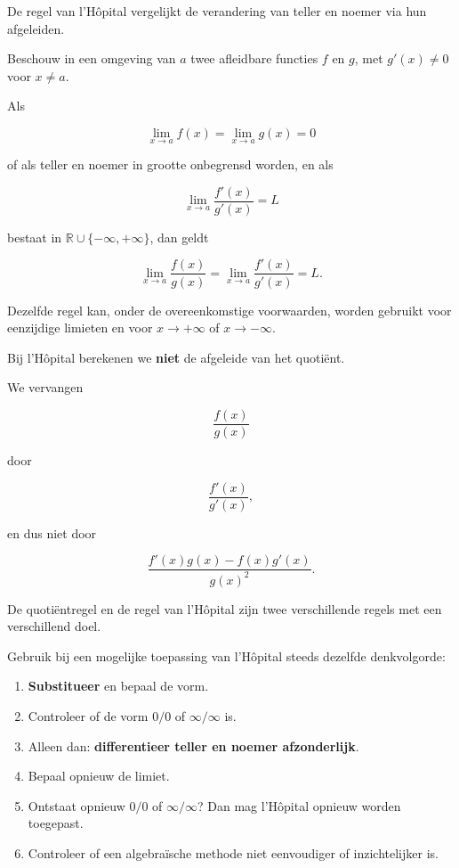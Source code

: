 \documentclass{ximera}
\begin{document}


De regel van l'Hôpital vergelijkt de verandering van teller en noemer
via hun afgeleiden.

\begin{eigenschap}
Beschouw in een omgeving van \(a\) twee afleidbare functies \(f\) en
\(g\), met \(g'(x)\neq0\) voor \(x\neq a\).

Als

\[\lim_{x\to a}f(x)=\lim_{x\to a}g(x)=0\]

of als teller en noemer in grootte onbegrensd worden, en als

\[\lim_{x\to a}\frac{f'(x)}{g'(x)}=L\]

bestaat in \(\mathbb{R}\cup\{-\infty,+\infty\}\), dan geldt

\[\boxed{\lim_{x\to a}\frac{f(x)}{g(x)}=\lim_{x\to a}\frac{f'(x)}{g'(x)}=L.}\]

Dezelfde regel kan, onder de overeenkomstige voorwaarden, worden gebruikt
voor eenzijdige limieten en voor \(x\to+\infty\) of \(x\to-\infty\).
\end{eigenschap}

\begin{opmerking}
Bij l'Hôpital berekenen we \textbf{niet} de afgeleide van het quotiënt.

We vervangen

\[\frac{f(x)}{g(x)}\]

door

\[\frac{f'(x)}{g'(x)},\]

en dus niet door

\[\frac{f'(x)g(x)-f(x)g'(x)}{g(x)^2}.\]

De quotiëntregel en de regel van l'Hôpital zijn twee verschillende regels
met een verschillend doel.
\end{opmerking}


Gebruik bij een mogelijke toepassing van l'Hôpital steeds dezelfde
denkvolgorde:

\begin{enumerate}
  \item \textbf{Substitueer} en bepaal de vorm.
  \item Controleer of de vorm \(0/0\) of \(\infty/\infty\) is.
  \item Alleen dan: \textbf{differentieer teller en noemer afzonderlijk}.
  \item Bepaal opnieuw de limiet.
  \item Ontstaat opnieuw \(0/0\) of \(\infty/\infty\)? Dan mag l'Hôpital opnieuw worden toegepast.
  \item Controleer of een algebraïsche methode niet eenvoudiger of inzichtelijker is.
\end{enumerate}
\end{document}
